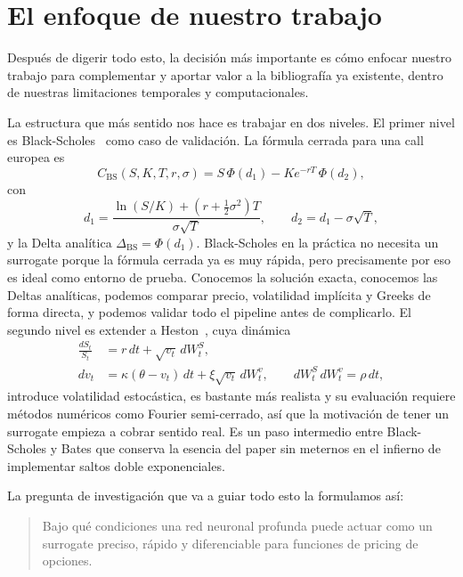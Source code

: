 \documentclass[11pt,a4paper]{article}
\begin{document}
\section{El enfoque de nuestro trabajo}

Después de digerir todo esto, la decisión más importante es cómo enfocar nuestro trabajo para complementar y aportar valor a la bibliografía ya existente, dentro de nuestras limitaciones temporales y computacionales.

La estructura que más sentido nos hace es trabajar en dos niveles. El primer nivel es Black-Scholes~\cite{blackscholes1973} como caso de validación. La fórmula cerrada para una call europea es
\begin{equation}
C_{\mathrm{BS}}(S, K, T, r, \sigma) = S\, \Phi(d_1) - K e^{-rT}\, \Phi(d_2),
\end{equation}
con
\begin{equation}
d_1 = \frac{\ln(S/K) + (r + \tfrac{1}{2}\sigma^2)T}{\sigma\sqrt{T}}, \qquad d_2 = d_1 - \sigma\sqrt{T},
\end{equation}
y la Delta analítica $\Delta_{\mathrm{BS}} = \Phi(d_1)$. Black-Scholes en la práctica no necesita un surrogate porque la fórmula cerrada ya es muy rápida, pero precisamente por eso es ideal como entorno de prueba. Conocemos la solución exacta, conocemos las Deltas analíticas, podemos comparar precio, volatilidad implícita y Greeks de forma directa, y podemos validar todo el pipeline antes de complicarlo. El segundo nivel es extender a Heston~\cite{heston1993}, cuya dinámica
\begin{align}
\frac{dS_t}{S_t} &= r\, dt + \sqrt{v_t}\, dW^S_t, \\
dv_t &= \kappa(\theta - v_t)\, dt + \xi \sqrt{v_t}\, dW^v_t, \qquad dW^S_t\, dW^v_t = \rho\, dt,
\end{align}
introduce volatilidad estocástica, es bastante más realista y su evaluación requiere métodos numéricos como Fourier semi-cerrado, así que la motivación de tener un surrogate empieza a cobrar sentido real. Es un paso intermedio entre Black-Scholes y Bates que conserva la esencia del paper sin meternos en el infierno de implementar saltos doble exponenciales.

La pregunta de investigación que va a guiar todo esto la formulamos así:

\begin{quote}
Bajo qué condiciones una red neuronal profunda puede actuar como un surrogate preciso, rápido y diferenciable para funciones de pricing de opciones.
\end{quote}
\end{document}
